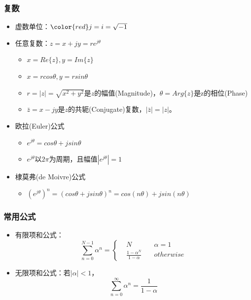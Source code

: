 \documentclass[CJKutf8,xcolor=pdftex,dvipsnames,table]{beamer}
\begin{document}
\begin{CJK*}{UTF8}{song}
  \begin{frame}
    \frametitle{复数} 
    \begin{itemize}
    \item 虚数单位：${\color{red}j}=i=\sqrt{-1}$
    \item 任意复数：$z=x+jy=re^{j\theta}$
        \begin{itemize}
        \item $x=Re\{z\}, y=Im\{z\}$
        \item $x=r cos\theta, y=r sin\theta$
        \item $r=|z|=\sqrt{x^2+y^2}$是$z$的幅值(Magnitude)，$\theta=Arg\{z\}$是z的相位(Phase)
        \item $\bar{z}=x-jy$是$z$的共轭(Conjugate)复数，$|\bar{z}|=|z|$。
        \end{itemize}
    \item 欧拉(Euler)公式
        \begin{itemize}
        \item $e^{j\theta}=cos\theta+jsin\theta$
        \item $e^{j\theta}$以$2\pi$为周期，且幅值$|e^{j\theta}|=1$
        \end{itemize}
    \item 棣莫弗(de Moivre)公式
        \begin{itemize}
        \item ${(e^{j\theta})}^n={(cos\theta+jsin\theta)}^n=cos(n\theta)+jsin(n\theta)$
        \end{itemize}    
    \end{itemize}
  \end{frame}  
  
  \begin{frame}
    \frametitle{常用公式} 
    \begin{itemize}
    \item 有限项和公式：
    	\[
\sum_{n=0}^{N-1}\alpha^n = 
\left\{
    \begin {aligned}
         & N \quad & \alpha=1 \\
         & \frac{1-\alpha^N}{1-\alpha} \quad & otherwise                  
    \end{aligned}
\right.
		\]        

    \item 无限项和公式：若$|\alpha|<1$，\[ \sum_{n=0}^{\infty}\alpha^n=\frac{1}{1-\alpha} \]   
    \end{itemize}
  \end{frame}  

\end{CJK*}
\end{document}
